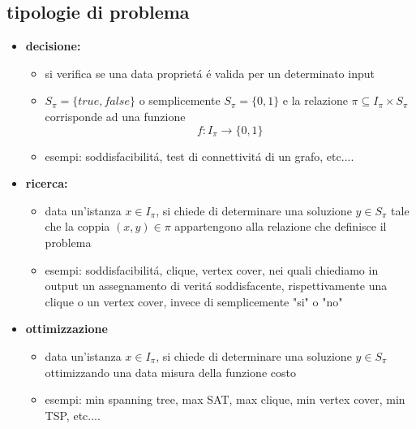 \subsection*{tipologie di problema}
\begin{flushleft}
	\begin{itemize}
		\item \textbf{decisione:}
			\begin{itemize}
				\item si verifica se una data propriet\'a \'e valida per un determinato input
				\item $S_{\pi}=\{true,false\}$ o semplicemente $S_{\pi}=\{0,1\}$ e la relazione $\pi\subseteq I_{\pi}\times S_{\pi}$ corrisponde ad una funzione $$f:I_{\pi}\rightarrow\{0,1\}$$ 
				\item esempi: soddisfacibilit\'a, test di connettivit\'a di un grafo, etc....
			\end{itemize}
		\item \textbf{ricerca:}
		\begin{itemize}
			\item data un'istanza $x\in I_{\pi}$, si chiede di determinare una soluzione $y\in S_{\pi}$ tale che la coppia $(x,y)\in\pi$ appartengono alla relazione che definisce il problema
			\item esempi: soddisfacibilit\'a, clique, vertex cover, nei quali chiediamo in output un assegnamento di verit\'a soddisfacente, rispettivamente una clique o un vertex cover, invece di semplicemente "si" o "no"
		\end{itemize}
		\item \textbf{ottimizzazione}
		\begin{itemize}
			\item data un'istanza $x\in I_{\pi}$, si chiede di determinare una soluzione $y\in S_{\pi}$ ottimizzando una data misura della funzione costo
			\item esempi: min spanning tree, max SAT, max clique, min vertex cover, min TSP, etc....
		\end{itemize}
	\end{itemize}
\end{flushleft}


